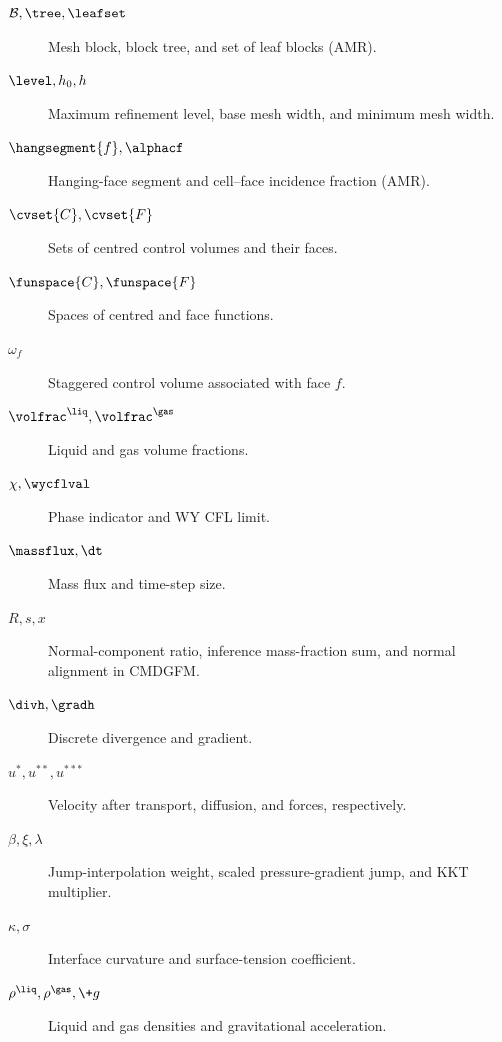 \begin{description}
\item[$\mathcal{B},\tree,\leafset$] Mesh block, block tree, and set of leaf blocks (AMR).
\item[$\level, h_0, h$] Maximum refinement level, base mesh width, and minimum mesh width.
\item[$\hangsegment{f},\alphacf$] Hanging-face segment and cell--face incidence fraction (AMR).
\item[$\cvset{C},\cvset{F}$] Sets of centred control volumes and their faces.
\item[$\funspace{C},\funspace{F}$] Spaces of centred and face functions.
\item[$\omega_f$] Staggered control volume associated with face $f$.
\item[$\volfrac^\liq,\volfrac^\gas$] Liquid and gas volume fractions.
\item[$\chi,\wycflval$] Phase indicator and WY CFL limit.
\item[$\massflux,\dt$] Mass flux and time-step size.
\item[$R,s,x$] Normal-component ratio, inference mass-fraction sum, and normal alignment in CMDGFM.
\item[$\divh,\gradh$] Discrete divergence and gradient.
\item[$u^*,u^{**},u^{***}$] Velocity after transport, diffusion, and forces, respectively.
\item[$\beta,\xi,\lambda$] Jump-interpolation weight, scaled pressure-gradient jump, and KKT multiplier.
\item[$\kappa,\sigma$] Interface curvature and surface-tension coefficient.
\item[$\rho^\liq,\rho^\gas,\+g$] Liquid and gas densities and gravitational acceleration.
\end{description}
